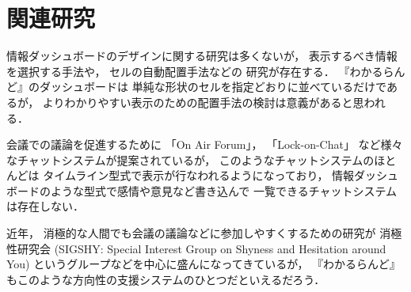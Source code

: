 \section{関連研究}

情報ダッシュボードのデザイン\cite{few}に関する研究は多くないが，
表示するべき情報を選択する手法\cite{Jones:2015:ECI:2800835.2800963}や，
セルの自動配置手法\cite{Hertzog:2015:BSP:2678025.2701383}などの
研究が存在する．
『わかるらんど』のダッシュボードは
単純な形状のセルを指定どおりに並べているだけであるが，
よりわかりやすい表示のための配置手法の検討は意義があると思われる．

会議での議論を促進するために
「On Air Forum」\cite{nishida2011}，
「Lock-on-Chat」\cite{nishida2006}
など様々なチャットシステムが提案されているが，
このようなチャットシステムのほとんどは
タイムライン型式で表示が行なわれるようになっており，
情報ダッシュボードのような型式で感情や意見など書き込んで
一覧できるチャットシステムは存在しない．

近年，
消極的な人間でも会議の議論などに参加しやすくするための研究が
消極性研究会 (SIGSHY: Special Interest Group on Shyness and Hesitation around You)
というグループなどを中心に盛んになってきているが\cite{kurihara2016}\cite{nishida2011}，
『わかるらんど』もこのような方向性の支援システムのひとつだといえるだろう．